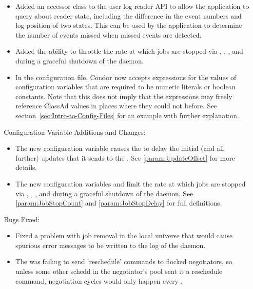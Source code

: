 \begin{itemize}
\item Added an accessor class to the user log reader API to allow the
  application to query about reader state, including the
  difference in the event numbers and log position of two states.  This
  can be used by the application to determine the number of events
  missed when missed events are detected.

\item Added the ability to throttle the rate at which jobs are
stopped via , , ,
and during a graceful shutdown of the  daemon.

\item In the configuration file, Condor now accepts expressions for
the values of configuration variables that are required to be 
numeric literals or boolean constants.  
Note that this does not imply that the
expressions may freely reference ClassAd values in places where they
could not before.  
See section~\ref{sec:Intro-to-Config-Files} for an example with
further explanation.

\end{itemize}

\noindent Configuration Variable Additions and Changes:

\begin{itemize}

\item The new configuration variable  
  causes the  to
  delay the initial (and all further) updates that it sends to the
  .  See \ref{param:UpdateOffset} for more details.

\item The new configuration variables
   and 
  limit the rate at which jobs are stopped via ,
  , , and during a graceful shutdown of
  the  daemon.
  See \ref{param:JobStopCount} and \ref{param:JobStopDelay} 
  for full definitions.

\end{itemize}

\noindent Bugs Fixed:

\begin{itemize}

\item Fixed a problem with job removal in the local universe that 
  would cause spurious error messages to be written to the log of the
   daemon.

\item The  was failing to send `reschedule' commands to
flocked negotiators, so unless some other schedd in the negotiator's
pool sent it a reschedule command, negotiation cycles would only
happen every .

\end{itemize}

